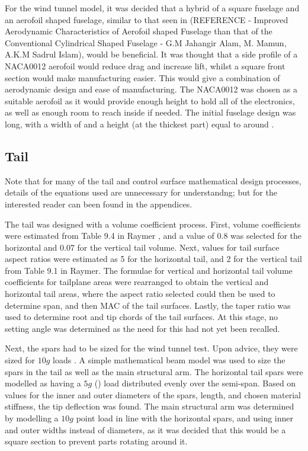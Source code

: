 \documentclass[../../main.tex]{subfiles}
\begin{document}

For the wind tunnel model, it was decided that a hybrid of a square fuselage and an aerofoil shaped fuselage, similar to that seen in (REFERENCE - Improved Aerodynamic Characteristics of Aerofoil shaped Fuselage than that of the Conventional Cylindrical Shaped Fuselage - G.M Jahangir Alam, M. Mamun, A.K.M Sadrul Islam), would be beneficial.
It was thought that a side profile of a NACA0012 aerofoil would reduce drag and increase lift, whilst a square front section would make manufacturing easier.
This would give a combination of aerodynamic design and ease of manufacturing.  
The NACA0012 was chosen as a suitable aerofoil as it would provide enough height to hold all of the electronics, as well as enough room to reach inside if needed. 
The initial fuselage design was  long, with a width of  and a height (at the thickest part) equal to around . 

\subsection{Tail} \label{sec:design-process:preliminary-design:tail}

Note that for many of the tail and control surface mathematical design processes, details of the equations used are unnecessary for understandng; but for the interested reader can been found in the appendices. 

The tail was designed with a volume coefficient process.
First, volume coefficients were estimated from Table 9.4 in Raymer \cite{raymer-89}, and a value of 0.8 was selected for the horizontal and 0.07 for the vertical tail volume.
Next, values for tail surface aspect ratios were estimated as 5 for the horizontal tail, and 2 for the vertical tail from Table 9.1 in Raymer.
The formulae for vertical and horizontal tail volume coefficients for tailplane areas were rearranged to obtain the vertical and horizontal tail areas, where the aspect ratio selected could then be used to determine span, and then MAC of the tail surfaces.
Lastly, the taper ratio was used to determine root and tip chords of the tail surfaces.
At this stage, no setting angle was determined as the need for this had not yet been recalled. 

Next, the spars had to be sized for the wind tunnel test.
Upon advice, they were sized for $10g$ loads \cite{towell-19}.
A simple mathematical beam model was used to size the spars in the tail as well as the main structural arm.
The horizontal tail spars were modelled as having a $5g$ () load distributed evenly over the semi-span.
Based on values for the inner and outer diameters of the spars, length, and chosen material stiffness, the tip deflection was found.
The main structural arm was determined by modelling a $10g$ point load in line with the horizontal spars, and using inner and outer widths instead of diameters, as it was decided that this would be a square section to prevent parts rotating around it.
\end{document}
